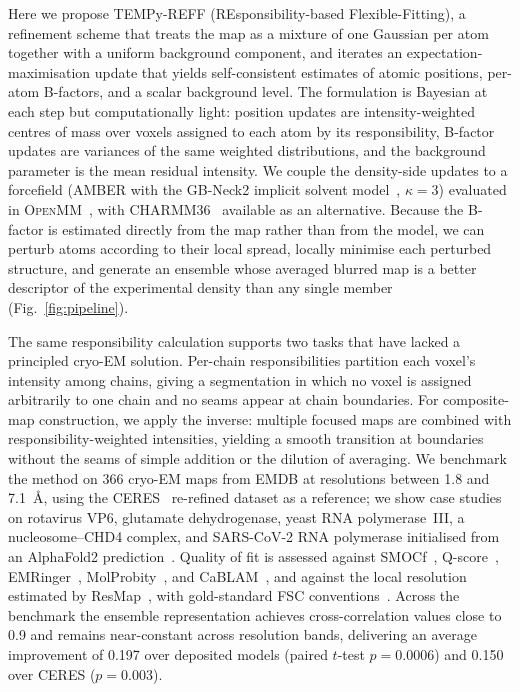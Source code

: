 \documentclass[11pt]{article}
\begin{document}
Here we propose TEMPy-REFF (REsponsibility-based Flexible-Fitting), a refinement scheme that treats the map as a mixture of one Gaussian per atom together with a uniform background component, and iterates an expectation-maximisation update that yields self-consistent estimates of atomic positions, per-atom B-factors, and a scalar background level. The formulation is Bayesian at each step but computationally light: position updates are intensity-weighted centres of mass over voxels assigned to each atom by its responsibility, B-factor updates are variances of the same weighted distributions, and the background parameter is the mean residual intensity. We couple the density-side updates to a forcefield (AMBER with the GB-Neck2 implicit solvent model~\cite{nguyen2013}, $\kappa=3$) evaluated in \textsc{OpenMM}~\cite{eastman2017}, with CHARMM36~\cite{huang2013} available as an alternative. Because the B-factor is estimated directly from the map rather than from the model, we can perturb atoms according to their local spread, locally minimise each perturbed structure, and generate an ensemble whose averaged blurred map is a better descriptor of the experimental density than any single member (Fig.~\ref{fig:pipeline}).

The same responsibility calculation supports two tasks that have lacked a principled cryo-EM solution. Per-chain responsibilities partition each voxel's intensity among chains, giving a segmentation in which no voxel is assigned arbitrarily to one chain and no seams appear at chain boundaries. For composite-map construction, we apply the inverse: multiple focused maps are combined with responsibility-weighted intensities, yielding a smooth transition at boundaries without the seams of simple addition or the dilution of averaging. We benchmark the method on 366 cryo-EM maps from EMDB at resolutions between 1.8 and 7.1~\AA, using the CERES~\cite{liebschner2019} re-refined dataset as a reference; we show case studies on rotavirus VP6, glutamate dehydrogenase, yeast RNA polymerase~III, a nucleosome--CHD4 complex, and SARS-CoV-2 RNA polymerase initialised from an AlphaFold2 prediction~\cite{jumper2021,baek2021}. Quality of fit is assessed against SMOCf~\cite{farabella2015,joseph2017}, Q-score~\cite{pintilie2020}, EMRinger~\cite{barad2015}, MolProbity~\cite{williams2018,chen2010}, and CaBLAM~\cite{williams2018}, and against the local resolution estimated by ResMap~\cite{kucukelbir2014}, with gold-standard FSC conventions~\cite{rosenthal2003}. Across the benchmark the ensemble representation achieves cross-correlation values close to 0.9 and remains near-constant across resolution bands, delivering an average improvement of 0.197 over deposited models (paired $t$-test $p=0.0006$) and 0.150 over CERES ($p=0.003$).
\end{document}
